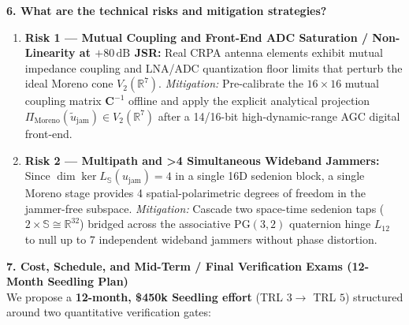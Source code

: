 \documentclass[10pt,a4paper]{article}
\newcommand{\R}{\mathbb{R}}
\newcommand{\Se}{\mathbb{S}}
\newcommand{\PG}{\mathrm{PG}}
\begin{document}
\textbf{6. What are the technical risks and mitigation strategies?}
\begin{enumerate}
    \item \textbf{Risk 1 — Mutual Coupling and Front-End ADC Saturation / Non-Linearity at $+80\,\mathrm{dB}$ JSR:} Real CRPA antenna elements exhibit mutual impedance coupling and LNA/ADC quantization floor limits that perturb the ideal Moreno cone $V_2(\R^7)$.
    \emph{Mitigation:} Pre-calibrate the $16\times 16$ mutual coupling matrix $\bm{C}^{-1}$ offline and apply the explicit analytical projection $\Pi_{\mathrm{Moreno}}(\tilde{u}_{\mathrm{jam}}) \in V_2(\R^7)$ after a 14/16-bit high-dynamic-range AGC digital front-end.
    \item \textbf{Risk 2 — Multipath and >4 Simultaneous Wideband Jammers:} Since $\dim\ker L_{\Se}(u_{\mathrm{jam}}) = 4$ in a single 16D sedenion block, a single Moreno stage provides 4 spatial-polarimetric degrees of freedom in the jammer-free subspace.
    \emph{Mitigation:} Cascade two space-time sedenion taps ($2 \times \Se \cong \R^{32}$) bridged across the associative $\PG(3,2)$ quaternion hinge $L_{12}$ to null up to 7 independent wideband jammers without phase distortion.
\end{enumerate}

\textbf{7. Cost, Schedule, and Mid-Term / Final Verification Exams (12-Month Seedling Plan)}\\
We propose a \textbf{12-month, \$450k Seedling effort} (TRL $3 \to$ TRL $5$) structured around two quantitative verification gates:
\end{document}
